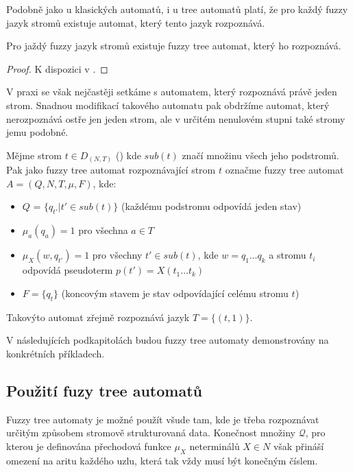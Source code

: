 \documentclass[a4paper,10pt]{article}
\begin{document}
Podobně jako u klasických automatů, i u tree automatů platí, že pro každý fuzzy jazyk stromů existuje automat, který tento jazyk rozpoznává.
\begin{theorem}
 Pro jaždý fuzzy jazyk stromů existuje fuzzy tree automat, který ho rozpoznává.
\end{theorem}
\begin{proof}
 K dispozici v \cite{MorMal-FuzzyLangThe}.
\end{proof}

V praxi se však nejčastěji setkáme s automatem, který rozpoznává právě jeden strom. Snadnou modifikací takového automatu pak obdržíme automat, který nerozpoznává ostře jen jeden strom, ale v určitém nenulovém stupni také stromy jemu podobné.

\begin{definition}
  Mějme strom $t \in D_{(N, T)}$ () kde $sub(t)$ značí množinu všech jeho podstromů. Pak jako fuzzy tree automat rozpoznávající strom $t$ označme fuzzy tree automat $A = (Q, N, T, \mu, F)$, kde:
  \begin{itemize}
   \item $Q$ = $\{ q_{t'} | t' \in sub(t) \}$ (každému podstromu odpovídá jeden stav)
   \item $\mu_a(q_a) = 1$ pro všechna $a \in T$
   \item $\mu_X(w, q_{t'}) = 1$ pro všechny $t' \in sub(t)$, kde $w = q_1 \dots q_k$ a stromu $t_i$ odpovídá pseudoterm $p(t') = X(t_1 \dots t_k)$
   \item $F = \{ q_t \}$ (koncovým stavem je stav odpovídající celému stromu $t$)
  \end{itemize}
\end{definition}

Takovýto automat zřejmě rozpoznává jazyk $T = \{ (t, 1) \}$. 

V následujících podkapitolách budou fuzzy tree automaty demonstrovány na konkrétních příkladech.

\subsection{Použití fuzy tree automatů}
Fuzzy tree automaty je možné použít všude tam, kde je třeba rozpoznávat určitým způsobem stromově strukturovaná data. Konečnost množiny $\mathcal{Q}$, pro kterou je definována přechodová funkce $\mu_X$ neterminálů $X \in N$ však přináší omezení na aritu každého uzlu, která tak vždy musí být konečným číslem.
\end{document}
